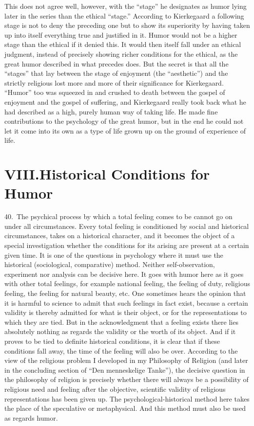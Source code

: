 \documentclass[12pt]{book}
\newcommand{\opage}[1]{\marginnote{\footnotesize\textit{[#1]}}}
\begin{document}
This does not agree well, however, with the ``stage'' he designates as humor lying later in the
series than the ethical ``stage.'' According to Kierkegaard a following stage is not to deny
the preceding one but to show its superiority by having taken up into itself everything true
and justified in it. Humor would not be a higher stage than the ethical if it denied this. It
would then itself fall under an ethical judgment, instead of precisely showing richer
conditions for the ethical, as the great humor described in what precedes does. But the secret
is that all the ``stages'' that lay between the stage of enjoyment (the ``aesthetic'') and the
strictly religious lost more and more of their significance for Kierkegaard. ``Humor'' too was
squeezed in and crushed to death between the gospel of enjoyment and the gospel of suffering,
and \opage{134}Kierkegaard really took back what he had described as a high, purely human way
of taking life. He made fine contributions to the psychology of the great humor, but in the end
he could not let it come into its own as a type of life grown up on the ground of experience of
life.

\chapter*{VIII.\quad Historical Conditions for Humor}
\opage{135}40.~The psychical process by which a total feeling comes to be cannot go on under
all circumstances. Every total feeling is conditioned by social and historical circumstances,
takes on a historical character, and it becomes the object of a special investigation whether
the conditions for its arising are present at a certain given time. It is one of the questions
in psychology where it must use the historical (sociological, comparative) method. Neither
self-observation, experiment nor analysis can be decisive here. It goes with humor here as it
goes with other total feelings, for example national feeling, the feeling of duty, religious
feeling, the feeling for natural beauty, etc. One sometimes hears the opinion that it is harmful
to science to admit that such feelings in fact exist, because a certain validity is thereby
admitted for what is their object, or for the representations to which they are tied. But in
the acknowledgment that a feeling exists there lies absolutely nothing as regards the validity
or the worth of its object. And if it proves to be tied to definite historical conditions, it
is clear that if these conditions fall away, the time of the feeling will also be over.
According to the view of the religious problem I developed in my Philosophy of Religion (and
later in the concluding section of ``Den menneskelige Tanke''), the decisive question in the
philosophy of religion is precisely whether there will always be a possibility of religious
need and feeling after the objective, scientific validity of religious representations has been
given up. The psychological-historical method here takes the place of the speculative or
metaphysical. And this method must also be used as regards humor.
\end{document}
